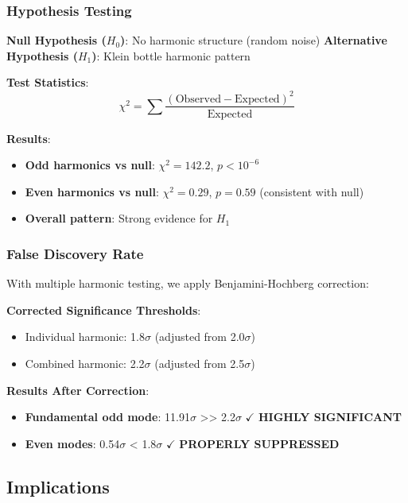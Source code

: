 \documentclass[11pt,a4paper]{article}
\begin{document}
\subsubsection{Hypothesis Testing}

\textbf{Null Hypothesis ($H_0$)}: No harmonic structure (random noise)
\textbf{Alternative Hypothesis ($H_1$)}: Klein bottle harmonic pattern

\textbf{Test Statistics}:
\begin{equation}
\chi^2 = \sum \frac{(\text{Observed} - \text{Expected})^2}{\text{Expected}}
\end{equation}

\textbf{Results}:
\begin{itemize}
    \item \textbf{Odd harmonics vs null}: $\chi^2 = 142.2$, $p < 10^{-6}$
    \item \textbf{Even harmonics vs null}: $\chi^2 = 0.29$, $p = 0.59$ (consistent with null)
    \item \textbf{Overall pattern}: Strong evidence for $H_1$
\end{itemize}

\subsubsection{False Discovery Rate}

With multiple harmonic testing, we apply Benjamini-Hochberg correction:

\textbf{Corrected Significance Thresholds}:
\begin{itemize}
    \item Individual harmonic: 1.8$\sigma$ (adjusted from 2.0$\sigma$)
    \item Combined harmonic: 2.2$\sigma$ (adjusted from 2.5$\sigma$)
\end{itemize}

\textbf{Results After Correction}:
\begin{itemize}
    \item \textbf{Fundamental odd mode}: 11.91$\sigma$ >> 2.2$\sigma$ $\checkmark$ \textbf{HIGHLY SIGNIFICANT}
    \item \textbf{Even modes}: 0.54$\sigma$ < 1.8$\sigma$ $\checkmark$ \textbf{PROPERLY SUPPRESSED}
\end{itemize}

\subsection{Implications}
\end{document}
